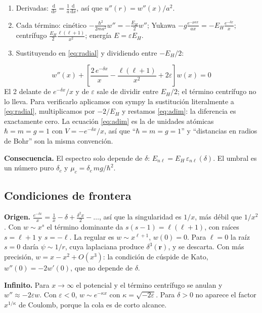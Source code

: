\documentclass[11pt]{article}
\newcommand{\dd}{\mathrm{d}}
\newcommand{\dc}{\delta_c}
\begin{document}
\begin{enumerate}
\item Derivadas: $\frac{\dd}{\dd r}=\frac1a\frac{\dd}{\dd x}$, así que $u''(r)=w''(x)/a^2$.
\item Cada término: cinético $-\frac{\hbar^2}{2ma^2}w''=-\frac{E_H}{2}w''$; Yukawa $-g\frac{e^{-\mu ax}}{ax}=-E_H\frac{e^{-\delta x}}{x}$; centrífugo $\frac{E_H}{2}\frac{\ell(\ell+1)}{x^2}$; energía $E=\varepsilon E_H$.
\item Sustituyendo en \eqref{eq:radial} y dividiendo entre $-E_H/2$:
\end{enumerate}
\begin{equation}
\boxed{\,w''(x)+\left[\frac{2\,e^{-\delta x}}{x}-\frac{\ell(\ell+1)}{x^2}+2\varepsilon\right]w(x)=0\,}
\label{eq:adim}
\end{equation}
El 2 delante de $e^{-\delta x}/x$ y de $\varepsilon$ sale de dividir entre $E_H/2$; el término centrífugo no lo lleva. Para verificarlo aplicamos con sympy la sustitución literalmente a \eqref{eq:radial}, multiplicamos por $-2/E_H$ y restamos \eqref{eq:adim}: la diferencia es exactamente cero. La ecuación \eqref{eq:adim} es la de unidades atómicas $\hbar=m=g=1$ con $V=-e^{-\delta x}/x$, así que ``$\hbar=m=g=1$'' y ``distancias en radios de Bohr'' son la misma convención.

\textbf{Consecuencia.} El espectro solo depende de $\delta$: $E_{n\ell}=E_H\,\varepsilon_{n\ell}(\delta)$. El umbral es un número puro $\dc$ y $\mu_c=\dc\,mg/\hbar^2$.

\subsection{Condiciones de frontera}

\textbf{Origen.} $\frac{e^{-\delta x}}{x}=\frac1x-\delta+\frac{\delta^2x}{2}-\dots$, así que la singularidad es $1/x$, más débil que $1/x^2$. Con $w\sim x^s$ el término dominante da $s(s-1)=\ell(\ell+1)$, con raíces $s=\ell+1$ y $s=-\ell$. La regular es $w\sim x^{\ell+1}$, $w(0)=0$. Para $\ell=0$ la raíz $s=0$ daría $\psi\sim1/r$, cuya laplaciana produce $\delta^3(\mathbf r)$, y se descarta. Con más precisión, $w=x-x^2+O(x^3)$: la condición de cúspide de Kato, $w''(0)=-2w'(0)$, que no depende de $\delta$.

\textbf{Infinito.} Para $x\to\infty$ el potencial y el término centrífugo se anulan y $w''\approx-2\varepsilon w$. Con $\varepsilon<0$, $w\sim e^{-\kappa x}$ con $\kappa=\sqrt{-2\varepsilon}$. Para $\delta>0$ no aparece el factor $x^{1/\kappa}$ de Coulomb, porque la cola es de corto alcance.
\end{document}
